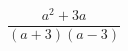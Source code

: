 \hspace*{2mm}\begin{minipage}[t]{\dimexpr\linewidth-2mm\relax}\vspace{0pt}
$\dfrac{a^2+3a}{(a+3)(a-3)}$\end{minipage}
